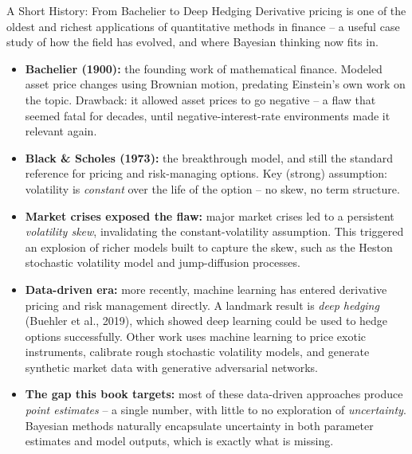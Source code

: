 \documentclass[aspectratio=169,10pt]{beamer}
\begin{document}
\begin{frame}[allowframebreaks]{A Short History: From Bachelier to Deep Hedging}
  Derivative pricing is one of the oldest and richest applications of
  quantitative methods in finance -- a useful case study of how the field
  has evolved, and where Bayesian thinking now fits in.

  \begin{itemize}
    \item \textbf{Bachelier (1900):} the founding work of mathematical
    finance. Modeled asset price changes using Brownian motion, predating
    Einstein's own work on the topic. Drawback: it allowed asset prices to
    go negative -- a flaw that seemed fatal for decades, until
    negative-interest-rate environments made it relevant again.
    \item \textbf{Black \& Scholes (1973):} the breakthrough model, and
    still the standard reference for pricing and risk-managing options. Key
    (strong) assumption: volatility is \emph{constant} over the life of the
    option -- no skew, no term structure.
    \item \textbf{Market crises exposed the flaw:} major market crises led
    to a persistent \emph{volatility skew}, invalidating the constant-volatility
    assumption. This triggered an explosion of richer models built to
    capture the skew, such as the Heston stochastic volatility model and
    jump-diffusion processes.
  \end{itemize}

  \framebreak

  \begin{itemize}
    \item \textbf{Data-driven era:} more recently, machine learning has
    entered derivative pricing and risk management directly. A landmark
    result is \emph{deep hedging} (Buehler et al., 2019), which showed deep
    learning could be used to hedge options successfully. Other work uses
    machine learning to price exotic instruments, calibrate rough
    stochastic volatility models, and generate synthetic market data with
    generative adversarial networks.
    \item \textbf{The gap this book targets:} most of these data-driven
    approaches produce \emph{point estimates} -- a single number, with
    little to no exploration of \emph{uncertainty}. Bayesian methods
    naturally encapsulate uncertainty in both parameter estimates and model
    outputs, which is exactly what is missing.
  \end{itemize}
\end{frame}
\end{document}

